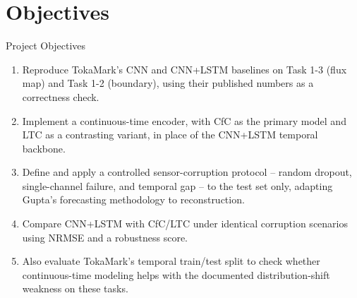 \documentclass[aspectratio=169]{beamer}
\begin{document}
\section{Objectives}
\begin{frame}{Project Objectives}
  \begin{enumerate}
    \item Reproduce TokaMark's CNN and CNN+LSTM baselines on Task 1-3 (flux
      map) and Task 1-2 (boundary), using their published numbers as a
      correctness check.
    \item Implement a continuous-time encoder, with CfC as the primary model
      and LTC as a contrasting variant, in place of the CNN+LSTM temporal
      backbone.
    \item Define and apply a controlled sensor-corruption protocol -- random
      dropout, single-channel failure, and temporal gap -- to the test set
      only, adapting Gupta's forecasting methodology to reconstruction.
    \item Compare CNN+LSTM with CfC/LTC under identical corruption scenarios
      using NRMSE and a robustness score.
    \item Also evaluate TokaMark's temporal train/test split to check whether
      continuous-time modeling helps with the documented distribution-shift
      weakness on these tasks.
  \end{enumerate}
\end{frame}

\end{document}
